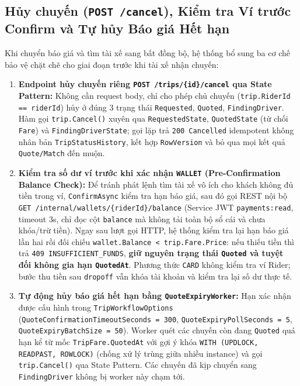 \documentclass[12pt,a4paper]{article}
\newcommand{\ab}{\allowbreak}
\begin{document}
\subsection{Hủy chuyến (\texttt{POST /cancel}), Kiểm tra Ví trước Confirm và Tự hủy Báo giá Hết hạn}
Khi chuyển báo giá và tìm tài xế sang bất đồng bộ, hệ thống bổ sung ba cơ chế bảo vệ chặt chẽ cho giai đoạn trước khi tài xế nhận chuyến:
\begin{enumerate}[nosep]
    \item \textbf{Endpoint hủy chuyến riêng \texttt{POST /trips/\{id\}/cancel} qua State Pattern:} Không cần request body, chỉ cho phép chủ chuyến (\texttt{trip.RiderId == riderId}) hủy ở đúng 3 trạng thái \texttt{Requested}, \texttt{Quoted}, \texttt{FindingDriver}. Hàm gọi \texttt{trip.Cancel()} xuyên qua \texttt{RequestedState}, \texttt{QuotedState} (từ chối \texttt{Fare}) và \texttt{FindingDriverState}; gọi lặp trả \texttt{200 Cancelled} idempotent không nhân bản \texttt{TripStatusHistory}, kết hợp \texttt{RowVersion} và bỏ qua mọi kết quả \texttt{Quote/\ab Match} đến muộn.
    \item \textbf{Kiểm tra số dư ví trước khi xác nhận \texttt{WALLET} (Pre-Confirmation Balance Check):} Để tránh phát lệnh tìm tài xế vô ích cho khách không đủ tiền trong ví, \texttt{ConfirmAsync} kiểm tra hạn báo giá, sau đó gọi REST nội bộ \texttt{GET /internal/wallets/\{riderId\}/balance} (Service JWT \texttt{payments:read}, timeout 3s, chỉ đọc cột \texttt{balance} mà không tải toàn bộ sổ cái và chưa khóa/trừ tiền). Ngay sau lượt gọi HTTP, hệ thống kiểm tra lại hạn báo giá lần hai rồi đối chiếu \texttt{wallet.Balance < trip.Fare.Price}: nếu thiếu tiền thì trả \texttt{409 INSUFFICIENT\_FUNDS}, \textbf{giữ nguyên trạng thái \texttt{Quoted} và tuyệt đối không gia hạn \texttt{QuotedAt}}. Phương thức \texttt{CARD} không kiểm tra ví Rider; bước thu tiền sau \texttt{dropoff} vẫn khóa tài khoản và kiểm tra lại số dư thực tế.
    \item \textbf{Tự động hủy báo giá hết hạn bằng \texttt{QuoteExpiryWorker}:} Hạn xác nhận được cấu hình trong \texttt{TripWorkflowOptions} (\texttt{QuoteConfirmationTimeoutSeconds = 300}, \texttt{QuoteExpiryPollSeconds = 5}, \texttt{QuoteExpiryBatchSize = 50}). Worker quét các chuyến còn đang \texttt{Quoted} quá hạn kể từ mốc \texttt{TripFare.QuotedAt} với gợi ý khóa \texttt{WITH (UPDLOCK, READPAST, ROWLOCK)} (chống xử lý trùng giữa nhiều instance) và gọi \texttt{trip.Cancel()} qua State Pattern. Các chuyến đã kịp chuyển sang \texttt{FindingDriver} không bị worker này chạm tới.
\end{enumerate}
\end{document}

